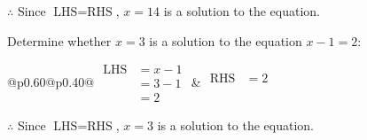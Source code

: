 \documentclass[12pt]{article}
\newcounter{minipagecount}
\begin{document}
\begin{multicols}{2}
\begin{minipage}[t]{0.40\textwidth}
    \noindent \(\therefore\) Since \(\text{LHS} = \text{RHS}\), \(x = 14\) is  a solution to the equation.

\end{minipage}

 \vspace*{16pt}
\noindent{(\theminipagecount)}\hspace{0.1mm} %
\begin{minipage}[t]{0.40\textwidth} %

    \noindent Determine whether \(x = 3\) is a solution to the equation \(x - 1 = 2\):
    \vspace{4pt}  %

    \noindent
    \renewcommand{\arraystretch}{1.3} %
    \begin{tabular}{@{}p{0.60\linewidth}@{}p{0.40\linewidth}@{}}
        \(\begin{aligned}
            \text{LHS} &= x - 1 \\
                    &= 3 - 1 \\
                    &= 2
        \end{aligned}\) &
        \(\begin{aligned}
            \text{RHS} &= 2\\
                    & \\
                    &
        \end{aligned}\)
    \end{tabular}
    \renewcommand{\arraystretch}{1.0} %
    \vspace{2pt}  %

    \noindent \(\therefore\) Since \(\text{LHS} = \text{RHS}\), \(x = 3\) is  a solution to the equation.

\end{minipage}

 \vspace*{16pt}
\noindent{(\theminipagecount)}\hspace{0.1mm} %
\begin{minipage}[t]{0.40\textwidth} %


\end{minipage}
\end{multicols}
\end{document}

